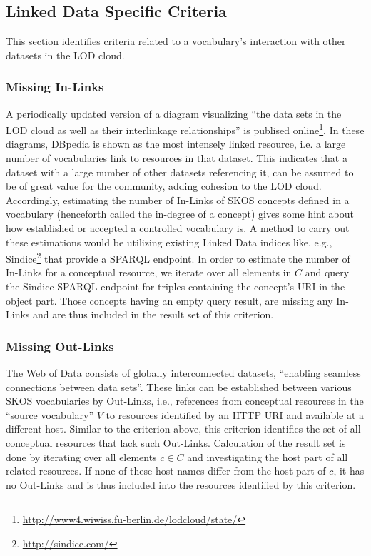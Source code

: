 
\subsection{Linked Data Specific Criteria}

This section identifies criteria related to a vocabulary's interaction with other datasets in the LOD cloud.

\subsubsection{Missing In-Links}
A periodically updated version of a diagram visualizing ``the data sets in the LOD cloud as well as their interlinkage relationships'' is publised online\footnote{\url{http://www4.wiwiss.fu-berlin.de/lodcloud/state/}}. In these diagrams, DBpedia is shown as the most intensely linked resource, i.e. a large number of vocabularies link to resources in that dataset. This indicates that a dataset with a large number of other datasets referencing it, can be assumed to be of great value for the community, adding cohesion to the LOD cloud. Accordingly, estimating the number of In-Links of SKOS concepts defined in a vocabulary (henceforth called the in-degree of a concept) gives some hint about how established or accepted a controlled vocabulary is. A method to carry out these estimations would be utilizing existing Linked Data indices like, e.g., Sindice\footnote{\url{http://sindice.com/}} that provide a SPARQL endpoint. In order to estimate the number of In-Links for a conceptual resource, we iterate over all elements in $C$ and query the Sindice SPARQL endpoint for triples containing the concept's URI in the object part. Those concepts having an empty query result, are missing any In-Links and are thus included in the result set of this criterion.

\subsubsection{Missing Out-Links}
The Web of Data consists of globally interconnected datasets, ``enabling seamless connections between data sets''\cite{Heath2011}. These links can be established between various SKOS vocabularies by Out-Links, i.e., references from conceptual resources in the ``source vocabulary'' $V$ to resources identified by an HTTP URI and available at a different host. Similar to the criterion above, this criterion identifies the set of all conceptual resources that lack such Out-Links. Calculation of the result set is done by iterating over all elements $c \in C$ and investigating the host part of all related resources. If none of these host names differ from the host part of $c$, it has no Out-Links and is thus included into the resources identified by this criterion.

